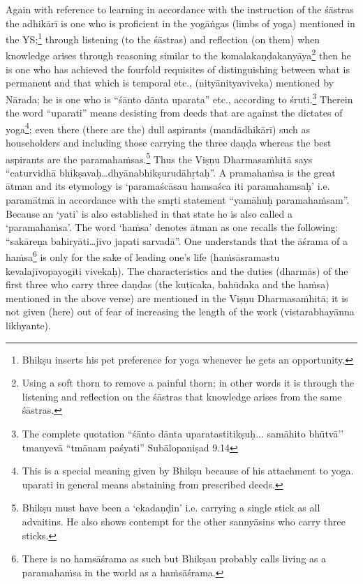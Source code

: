 Again with reference to learning in accordance with the instruction of the śāstras the adhikārī is one who is proficient in the yogāṅgas (limbs of yoga) mentioned in the YS;\footnote{Bhikṣu inserts his pet preference for yoga whenever he gets an opportunity.} through listening (to the śāstras) and reflection (on them) when knowledge arises through reasoning similar to the komalakaṇḍakanyāya\footnote{Using a soft thorn to remove a painful thorn; in other words it is through the listening and reflection on the śāstras that knowledge arises from the same śāstras.} then he is one who has achieved the fourfold requisites of distinguishing between what is permanent and that which is temporal etc., (nityānityaviveka) mentioned by Nārada; he is one who is “śānto dānta uparata” etc., according to śruti.\footnote{The complete quotation “śānto dānta uparatastitikṣuḥ... samāhito bhūtvā’’ tmanyevā ``tmānam paśyati” Subālopaniṣad 9.14}  Therein the word “uparati” means desisting from deeds that are against the dictates of yoga\footnote{This is a special meaning given by Bhikṣu because of his attachment to yoga. uparati in general means abstaining from prescribed deeds.}; even there (there are the) dull aspirants (mandādhikārī) such as householders and including those carrying the three daṇḍa whereas the best aspirants are the paramahaṁsas.\footnote{Bhikṣu must have been a ‘ekadaṇḍin’ i.e. carrying a single stick as all advaitins. He also shows contempt for the other sannyāsins who carry three sticks.} Thus the Viṣṇu Dharmasaṁhitā says “caturvidhā bhikṣavaḥ…dhyānabhikṣurudāhṛtaḥ”.  A pramahaṁsa is the great ātman and its etymology is ‘paramaścāsau hamsaśca iti paramahamsaḥ’ i.e. paramātmā in accordance with the smṛti statement “yamāhuḥ paramahaṁsam”. Because an ‘yati’ is also established in that state he is also called a ‘paramahaṁsa’. The word ‘haṁsa’ denotes ātman as one recalls the following: “sakāreṇa bahiryāti…jīvo japati sarvadā”. One understands that the āśrama of a haṁsa\footnote{There is no hamsāśrama as such but Bhikṣau probably calls living as a paramahaṁsa in the world as a haṁsāśrama.} is only for the sake of leading one’s life (haṁsāsramastu kevalajīvopayogīti vivekaḥ). The characteristics and the duties (dharmās) of the first three who carry three daṇḍas (the kuṭīcaka, bahūdaka and the haṁsa) mentioned in the above verse) are mentioned in the Viṣṇu Dharmasaṁhitā; it is not given (here) out of fear of increasing   the length of the work (vistarabhayānna likhyante). 

